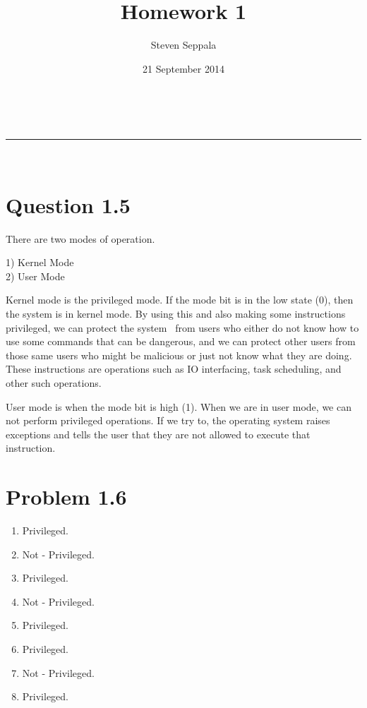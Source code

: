 \documentclass[a4paper,11pt]{article}
\makeatletter
\newcommand{\linia}{\rule{\linewidth}{0.5pt}}
\theoremstyle{mytheor}
\renewcommand{\maketitle}{
\begin{center}
\vspace{2ex}
{\huge \textsc{\@title}}
\vspace{1ex}
\\
\linia\\
\@author \hfill \@date
\vspace{4ex}
\end{center}
}
\makeatother
\begin{document}
\title{Homework \textnumero{} 1}

\author{Steven Seppala}

\date{21 September 2014}

\maketitle

\section*{Question 1.5}

There are two modes of operation. \\
\begin{center}
1) Kernel Mode \\
2) User Mode \\
\end{center}

Kernel mode is the privileged mode. If the mode bit is in the low state (0), then the system is in kernel mode. By using this and also making some instructions privileged, we can protect the system \ from users who either do not know how to use some commands that can be dangerous, and we can protect
other users from those same users who might be malicious or just not know what they are doing. These instructions are operations such as IO interfacing, task scheduling, and other such operations. \par
    User mode is when the mode bit is high (1). When we are in user mode, we can not perform privileged operations. If we try to, the operating system raises exceptions and tells the user that they are not allowed to execute that instruction. 

\section*{Problem 1.6}
\begin{center}
\begin{enumerate}
\item Privileged.
\item Not - Privileged.
\item Privileged.
\item Not - Privileged.
\item Privileged.
\item Privileged.
\item Not - Privileged.
\item Privileged.
\end{enumerate}
\end{center}
\pagebreak
\end{document}
